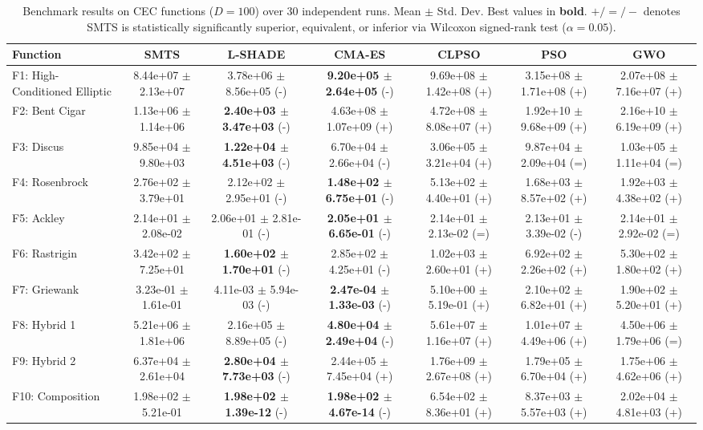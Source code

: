 \documentclass[journal]{IEEEtran}
\begin{document}
\begin{table}[t]
\centering
\caption{Benchmark results on CEC functions ($D = 100$) over 30 independent runs. Mean $\pm$ Std. Dev. Best values in \textbf{bold}. $+/=/-$ denotes SMTS is statistically significantly superior, equivalent, or inferior via Wilcoxon signed-rank test ($\alpha = 0.05$).}
\label{tab:results_D100}
\scriptsize
\begin{tabular}{lcccccc}
\hline
Function & \textbf{SMTS} & \textbf{L-SHADE} & \textbf{CMA-ES} & \textbf{CLPSO} & \textbf{PSO} & \textbf{GWO} \\
\hline
F1: High-Conditioned Elliptic & 8.44e+07 $\pm$ 2.13e+07 & 3.78e+06 $\pm$ 8.56e+05 (-) & \textbf{9.20e+05 $\pm$ 2.64e+05} (-) & 9.69e+08 $\pm$ 1.42e+08 (+) & 3.15e+08 $\pm$ 1.71e+08 (+) & 2.07e+08 $\pm$ 7.16e+07 (+) \\
F2: Bent Cigar & 1.13e+06 $\pm$ 1.14e+06 & \textbf{2.40e+03 $\pm$ 3.47e+03} (-) & 4.63e+08 $\pm$ 1.07e+09 (+) & 4.72e+08 $\pm$ 8.08e+07 (+) & 1.92e+10 $\pm$ 9.68e+09 (+) & 2.16e+10 $\pm$ 6.19e+09 (+) \\
F3: Discus & 9.85e+04 $\pm$ 9.80e+03 & \textbf{1.22e+04 $\pm$ 4.51e+03} (-) & 6.70e+04 $\pm$ 2.66e+04 (-) & 3.06e+05 $\pm$ 3.21e+04 (+) & 9.87e+04 $\pm$ 2.09e+04 (=) & 1.03e+05 $\pm$ 1.11e+04 (=) \\
F4: Rosenbrock & 2.76e+02 $\pm$ 3.79e+01 & 2.12e+02 $\pm$ 2.95e+01 (-) & \textbf{1.48e+02 $\pm$ 6.75e+01} (-) & 5.13e+02 $\pm$ 4.40e+01 (+) & 1.68e+03 $\pm$ 8.57e+02 (+) & 1.92e+03 $\pm$ 4.38e+02 (+) \\
F5: Ackley & 2.14e+01 $\pm$ 2.08e-02 & 2.06e+01 $\pm$ 2.81e-01 (-) & \textbf{2.05e+01 $\pm$ 6.65e-01} (-) & 2.14e+01 $\pm$ 2.13e-02 (=) & 2.13e+01 $\pm$ 3.39e-02 (-) & 2.14e+01 $\pm$ 2.92e-02 (=) \\
F6: Rastrigin & 3.42e+02 $\pm$ 7.25e+01 & \textbf{1.60e+02 $\pm$ 1.70e+01} (-) & 2.85e+02 $\pm$ 4.25e+01 (-) & 1.02e+03 $\pm$ 2.60e+01 (+) & 6.92e+02 $\pm$ 2.26e+02 (+) & 5.30e+02 $\pm$ 1.80e+02 (+) \\
F7: Griewank & 3.23e-01 $\pm$ 1.61e-01 & 4.11e-03 $\pm$ 5.94e-03 (-) & \textbf{2.47e-04 $\pm$ 1.33e-03} (-) & 5.10e+00 $\pm$ 5.19e-01 (+) & 2.10e+02 $\pm$ 6.82e+01 (+) & 1.90e+02 $\pm$ 5.20e+01 (+) \\
F8: Hybrid 1 & 5.21e+06 $\pm$ 1.81e+06 & 2.16e+05 $\pm$ 8.89e+05 (-) & \textbf{4.80e+04 $\pm$ 2.49e+04} (-) & 5.61e+07 $\pm$ 1.16e+07 (+) & 1.01e+07 $\pm$ 4.49e+06 (+) & 4.50e+06 $\pm$ 1.79e+06 (=) \\
F9: Hybrid 2 & 6.37e+04 $\pm$ 2.61e+04 & \textbf{2.80e+04 $\pm$ 7.73e+03} (-) & 2.44e+05 $\pm$ 7.45e+04 (+) & 1.76e+09 $\pm$ 2.67e+08 (+) & 1.79e+05 $\pm$ 6.70e+04 (+) & 1.75e+06 $\pm$ 4.62e+06 (+) \\
F10: Composition & 1.98e+02 $\pm$ 5.21e-01 & \textbf{1.98e+02 $\pm$ 1.39e-12} (-) & \textbf{1.98e+02 $\pm$ 4.67e-14} (-) & 6.54e+02 $\pm$ 8.36e+01 (+) & 8.37e+03 $\pm$ 5.57e+03 (+) & 2.02e+04 $\pm$ 4.81e+03 (+) \\
\hline
\end{tabular}
\end{table}
\end{document}
